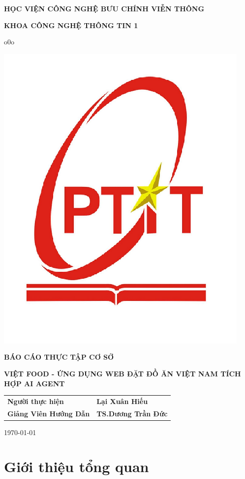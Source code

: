 \documentclass[12pt,a4paper]{report}
\begin{document}
\begin{titlepage}
    \centering
    \vspace*{1cm}
    
    \textbf{\Large HỌC VIỆN CÔNG NGHỆ BƯU CHÍNH VIỄN THÔNG}
    
    \textbf{\large KHOA CÔNG NGHỆ THÔNG TIN 1}
    
    \vspace{0.5cm}
    \underline{\hspace{3cm}} o0o \underline{\hspace{3cm}}
    
    \vspace{1cm}
    \includegraphics[width=0.35\linewidth]{images/ptit_logo.png}
    
    \vspace{1.5cm}
    \textbf{\LARGE BÁO CÁO THỰC TẬP CƠ SỞ}
    \vspace{0.5cm}

    \textbf{\Large VIỆT FOOD - ỨNG DỤNG WEB ĐẶT ĐỒ ĂN VIỆT NAM TÍCH HỢP AI AGENT} 
    \vspace{1cm}

    \author{Lại Xuân Hiếu}

    \begin{tabular}{ll}
        {\textbf{\large Người thực hiện }} & {\textbf{\large Lại Xuân Hiếu}} \\
        {\textbf{\large Giảng Viên Hướng Dẫn }} & {\textbf{\large TS.Dương Trần Đức}} \\
    \end{tabular}

    \vfill
    \today
\end{titlepage}



\tableofcontents

\chapter{Giới thiệu tổng quan}

\end{document}
